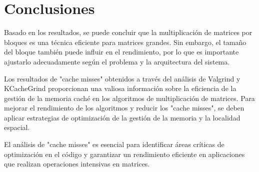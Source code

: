 \section{Conclusiones}
Basado en los resultados, se puede concluir que la multiplicación de matrices por bloques es una técnica eficiente para matrices grandes. Sin embargo, el tamaño del bloque también puede influir en el rendimiento, por lo que es importante ajustarlo adecuadamente según el problema y la arquitectura del sistema.

Los resultados de "cache misses" obtenidos a través del análisis de Valgrind y KCacheGrind proporcionan una valiosa información sobre la eficiencia de la gestión de la memoria caché en los algoritmos de multiplicación de matrices. Para mejorar el rendimiento de los algoritmos y reducir los "cache misses", se deben aplicar estrategias de optimización de la gestión de la memoria y la localidad espacial.

El análisis de "cache misses" es esencial para identificar áreas críticas de optimización en el código y garantizar un rendimiento eficiente en aplicaciones que realizan operaciones intensivas en matrices.
